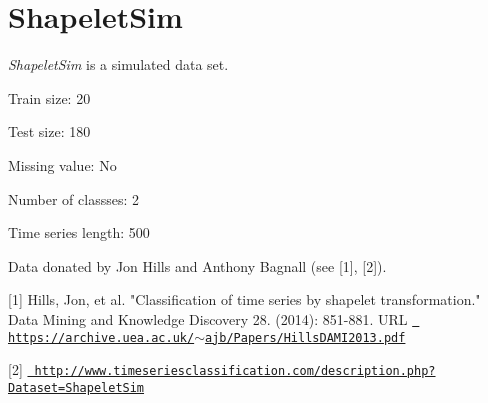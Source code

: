 \chapter{Shapelet\+Sim}
\hypertarget{md_external_2data_2UCRArchive__2018_2ShapeletSim_2README}{}\label{md_external_2data_2UCRArchive__2018_2ShapeletSim_2README}
\label{md_external_2data_2UCRArchive__2018_2ShapeletSim_2README_autotoc_md208}%
%
 {\itshape Shapelet\+Sim} is a simulated data set.

Train size\+: 20

Test size\+: 180

Missing value\+: No

Number of classses\+: 2

Time series length\+: 500

Data donated by Jon Hills and Anthony Bagnall (see \mbox{[}1\mbox{]}, \mbox{[}2\mbox{]}).

\mbox{[}1\mbox{]} Hills, Jon, et al. "{}\+Classification of time series by shapelet transformation."{} Data Mining and Knowledge Discovery 28. (2014)\+: 851-\/881. URL \href{https://archive.uea.ac.uk/~ajb/Papers/HillsDAMI2013.pdf}{\texttt{ https\+://archive.\+uea.\+ac.\+uk/\texorpdfstring{$\sim$}{\string~}ajb/\+Papers/\+Hills\+DAMI2013.\+pdf}}

\mbox{[}2\mbox{]} \href{http://www.timeseriesclassification.com/description.php?Dataset=ShapeletSim}{\texttt{ http\+://www.\+timeseriesclassification.\+com/description.\+php?\+Dataset=\+Shapelet\+Sim}} 